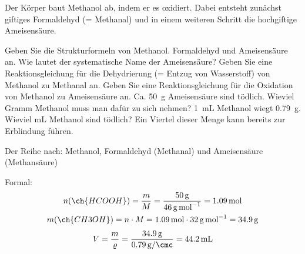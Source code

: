 \documentclass[DIV11]{scrartcl}
\begin{document}
\begin{question}[name=Methanol-Metabolismus]
Der Körper baut Methanol ab, indem er es oxidiert.  Dabei entsteht zunächst
giftiges Formaldehyd (= Methanal) und in einem weiteren Schritt die
hochgiftige Ameisensäure.
\begin{tasks}
  \task Geben Sie die Strukturformeln von Methanol. Formaldehyd und
    Ameisensäure an.  Wie lautet der systematische Name der Ameisensäure?
  \task Geben Sie eine Reaktionsgleichung für die Dehydrierung (= Entzug von
    Wasserstoff) von Methanol zu Methanal an.
  \task Geben Sie eine Reaktionsgleichung für die Oxidation von Methanol zu
    Ameisensäure an.
  \task {} Ca. \SI{50}{g}\footnotemark{} Ameisensäure sind
    tödlich. Wieviel Gramm Methanol muss man dafür zu sich nehmen?
  \task \SI{1}{mL} Methanol wiegt \SI{0.79}{g}. Wieviel \si{mL} Methanol sind
    tödlich?   Ein Viertel dieser Menge kann bereits zur Erblindung führen.
\end{tasks}
\end{question}

\begin{solution}[name=Methanol-Metabolismus]
\begin{tasks}
  \task Der Reihe nach: Methanol, Formaldehyd (Methanal) und Ameisensäure
    (Methansäure)\par
     \quad {}
    \quad {}
  \task {}
  \task Formal: 
  \task
    \begin{gather*}
      n(\ch{HCOOH})
        = \frac{m}{M}
        = \frac{\SI{50}{\gram}}{\SI{46}{\gram\per\mole}}
        = \SI{1.09}{\mole} \\
      m(\ch{CH3OH})
        = n\cdot M
        = \SI{1.09}{\mole}\cdot\SI{32}{\gram\per\mole}
        = \SI{34.9}{\gram}
    \end{gather*}
  \task
    \[
      V = \frac{m}{\varrho}
        = \frac{\SI{34.9}{g}}{\SI{0.79}{\gram\per\cmc}}
        = \SI{44.2}{\milli\liter}
    \]
\end{tasks}
\end{solution}
\end{document}
